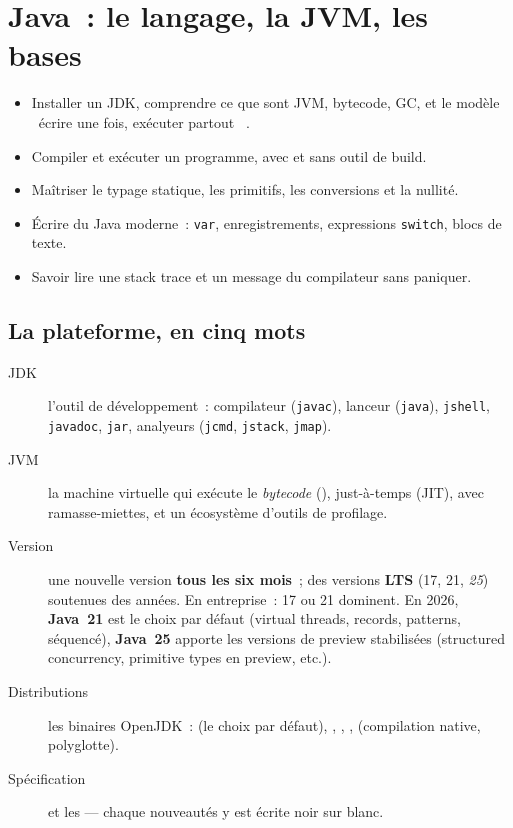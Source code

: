 \chapter{Java~: le langage, la JVM, les bases}
\label{ch-java-bases}

\begin{objectif}
\begin{itemize}
  \item Installer un JDK, comprendre ce que sont JVM, bytecode, GC, et le mod\`ele \og ~\'ecrire une fois,
        ex\'ecuter partout~ \fg{}.
  \item Compiler et ex\'ecuter un programme, avec et sans outil de build.
  \item Ma\^itriser le typage statique, les primitifs, les conversions et la nullit\'e.
  \item \'Ecrire du Java moderne~: \verb|var|, enregistrements, expressions \verb|switch|, blocs de texte.
  \item Savoir lire une stack trace et un message du compilateur sans paniquer.
\end{itemize}
\end{objectif}

\section{La plateforme, en cinq mots}

\begin{description}
  \item[JDK] l'outil de d\'eveloppement~: compilateur (\verb|javac|), lanceur (\verb|java|),
        \verb|jshell|, \verb|javadoc|, \verb|jar|, analyeurs (\verb|jcmd|, \verb|jstack|, \verb|jmap|).
  \item[JVM] la machine virtuelle qui ex\'ecute le \emph{bytecode} (), just-\`a-temps
        (JIT), avec ramasse-miettes, et un \'ecosyst\`eme d'outils de profilage.
  \item[Version] une nouvelle version \textbf{tous les six mois}~; des versions \textbf{LTS}
        (17, 21, \emph{25}) soutenues des ann\'ees. En entreprise~: 17 ou 21 dominent.
        En 2026, \textbf{Java~21} est le choix par d\'efaut (virtual threads, records, patterns,
        s\'equenc\'e), \textbf{Java~25} apporte les versions de preview stabilis\'ees (structured
        concurrency, primitive types en preview, etc.).
  \item[Distributions] les binaires OpenJDK~: 
        (le choix par d\'efaut), ,
        , ,
         (compilation native, polyglotte).
  \item[Sp\'ecification]  et les
        --- chaque nouveaut\'es y est \'ecrite noir sur blanc.
\end{description}

